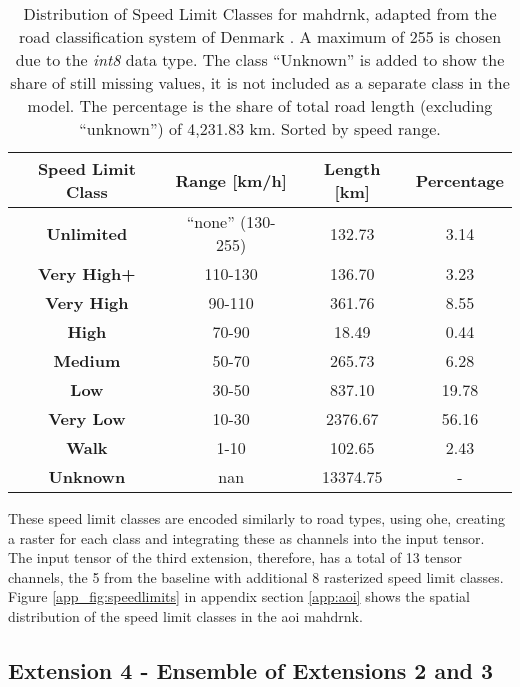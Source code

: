 \begin{table}[htb]
    \centering
    \caption[Distribution of Speed Limit Classes for ]{Distribution of Speed Limit Classes for \gls{mahdrnk}, adapted from the road classification system of Denmark \autocite{Vitkiene.Puodziukas.ea2017}. A maximum of 255 is chosen due to the \emph{int8} data type. The class \enquote{Unknown} is added to show the share of still missing values, it is not included as a separate class in the model. The percentage is the share of total road length (excluding \enquote{unknown}) of 4,231.83 km. Sorted by speed range.}
    \begin{tabular}{cccc}
        \toprule
        \textbf{Speed Limit Class} & \textbf{Range [km/h]} & \textbf{Length [km]} & \textbf{Percentage} \\
        \midrule
        \textbf{Unlimited} & \enquote{none} (130-255) & 132.73 & 3.14 \\
        \textbf{Very High+} & 110-130 & 136.70 & 3.23 \\
        \textbf{Very High} & 90-110 & 361.76 & 8.55 \\
        \textbf{High} & 70-90 & 18.49 & 0.44 \\
        \textbf{Medium} & 50-70 & 265.73 & 6.28 \\
        \textbf{Low} & 30-50 & 837.10 & 19.78 \\
        \textbf{Very Low} & 10-30 & 2376.67 & 56.16 \\
        \textbf{Walk} & 1-10 & 102.65 & 2.43 \\
        \midrule
        \textbf{Unknown} & \gls{nan} & 13374.75 & - \\
        \bottomrule
    \end{tabular}
    \label{tab:roadnetwork_speeds}
\end{table}

These speed limit classes are encoded similarly to road types, using \gls{ohe}, creating a raster for each class and integrating these as channels into the input tensor. The input tensor of the third extension, therefore, has a total of 13 tensor channels, the 5 from the baseline with additional 8 rasterized speed limit classes. Figure \ref{app_fig:speedlimits} in appendix section \ref{app:aoi} shows the spatial distribution of the speed limit classes in the \gls{aoi} \gls{mahdrnk}.

\subsection{Extension 4 - Ensemble of Extensions 2 and 3}


